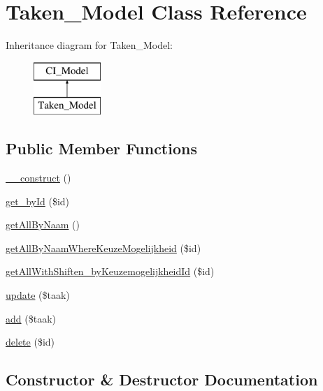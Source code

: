 \hypertarget{class_taken___model}{}\section{Taken\+\_\+\+Model Class Reference}
\label{class_taken___model}
Inheritance diagram for Taken\+\_\+\+Model\+:\begin{figure}[H]
\begin{center}
\leavevmode
\includegraphics[height=2.000000cm]{class_taken___model}
\end{center}
\end{figure}
\subsection*{Public Member Functions}
\begin{DoxyCompactItemize}
\item 
\mbox{\hyperlink{class_taken___model_a095c5d389db211932136b53f25f39685}{\+\_\+\+\_\+construct}} ()
\item 
\mbox{\hyperlink{class_taken___model_a98d28a4d9a29d40c5a8aa0176f19a919}{get\+\_\+by\+Id}} (\$id)
\item 
\mbox{\hyperlink{class_taken___model_a2b035b1ffd1cbe651b35bb3e53d72c09}{get\+All\+By\+Naam}} ()
\item 
\mbox{\hyperlink{class_taken___model_a6f3e4d26ab480501524eabb01683f5f7}{get\+All\+By\+Naam\+Where\+Keuze\+Mogelijkheid}} (\$id)
\item 
\mbox{\hyperlink{class_taken___model_a43d1fa46aefbe64343373fac217d6bdb}{get\+All\+With\+Shiften\+\_\+by\+Keuzemogelijkheid\+Id}} (\$id)
\item 
\mbox{\hyperlink{class_taken___model_a2fdc722cb2e60f87bc93a5f2390f88bc}{update}} (\$taak)
\item 
\mbox{\hyperlink{class_taken___model_ab4986b088d8f7831b9a8dce8e97485bb}{add}} (\$taak)
\item 
\mbox{\hyperlink{class_taken___model_a2f8258add505482d7f00ea26493a5723}{delete}} (\$id)
\end{DoxyCompactItemize}


\subsection{Constructor \& Destructor Documentation}
\mbox{\label{class_taken___model_a095c5d389db211932136b53f25f39685}} 
